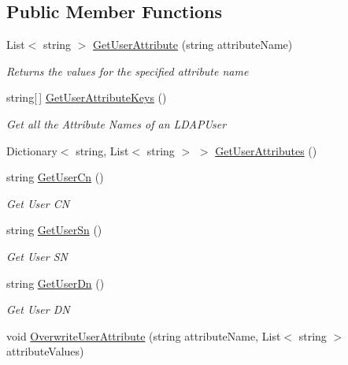 \subsection*{Public Member Functions}
\begin{DoxyCompactItemize}
\item 
List$<$ string $>$ \hyperlink{class_l_d_a_p_library_1_1_fake_ldap_user_af902518a89a2b51531a12ef09cf3b5bd}{Get\+User\+Attribute} (string attribute\+Name)
\begin{DoxyCompactList}\small\item\em Returns the values for the specified attribute name \end{DoxyCompactList}\item 
string\mbox{[}$\,$\mbox{]} \hyperlink{class_l_d_a_p_library_1_1_fake_ldap_user_aa84ff42fd32baded585d7cc1e33b08ba}{Get\+User\+Attribute\+Keys} ()
\begin{DoxyCompactList}\small\item\em Get all the Attribute Names of an L\+D\+A\+P\+User \end{DoxyCompactList}\item 
Dictionary$<$ string, List$<$ string $>$ $>$ \hyperlink{class_l_d_a_p_library_1_1_fake_ldap_user_a98292dfb6af91b64f8e1378331b422c6}{Get\+User\+Attributes} ()
\item 
string \hyperlink{class_l_d_a_p_library_1_1_fake_ldap_user_a632602fc00b15975f50b9feaa2fa31f3}{Get\+User\+Cn} ()
\begin{DoxyCompactList}\small\item\em Get User C\+N \end{DoxyCompactList}\item 
string \hyperlink{class_l_d_a_p_library_1_1_fake_ldap_user_a095d24dc1e2358a4440021cd3001ca43}{Get\+User\+Sn} ()
\begin{DoxyCompactList}\small\item\em Get User S\+N \end{DoxyCompactList}\item 
string \hyperlink{class_l_d_a_p_library_1_1_fake_ldap_user_ac29eaa7b10a2f951e81279c61c65cc4a}{Get\+User\+Dn} ()
\begin{DoxyCompactList}\small\item\em Get User D\+N \end{DoxyCompactList}\item 
void \hyperlink{class_l_d_a_p_library_1_1_fake_ldap_user_a925852deb067585fde60b2aa6713fb53}{Overwrite\+User\+Attribute} (string attribute\+Name, List$<$ string $>$ attribute\+Values)

\end{DoxyCompactItemize}
